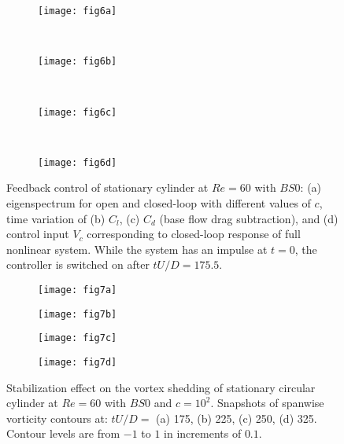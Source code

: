 \documentclass[standard]{jfm}
\begin{document}
\begin{figure}
\centering
\begin{minipage}{.4\textwidth}
  \begin{subfigure}[c]{0.45\textwidth}
\centering
  \texttt{[image: fig6a]} 
    \caption{}
    \label{fig:sta_eig}
    \end{subfigure}  \\
\end{minipage} 
\begin{minipage}{.4\textwidth}
\begin{subfigure}[b]{0.4\textwidth} 
\centering
  \texttt{[image: fig6b]}
	\caption{}
	\label{fig:lco_cl}
	\end{subfigure}	\\
\begin{subfigure}[b]{0.4\textwidth} 
\centering
  \texttt{[image: fig6c]} 
	\caption{}
	\label{fig:lco_cd}
	\end{subfigure}	\\
\begin{subfigure}[b]{0.4\textwidth} 
\centering
  \texttt{[image: fig6d]}
	\caption{}
	\label{fig:lco_uc}
	\end{subfigure}				
\end{minipage}%
\caption{Feedback control of stationary cylinder at $Re=60$ with $BS0$: 
      (a) eigenspectrum for open and closed-loop with different values of $c$, 
         time variation of (b) $C_l$, (c) $C_d$ (base flow drag subtraction),
         and (d) control input $V_c$ corresponding to closed-loop response of  
         full nonlinear system.  While the system has an impulse at $t=0$, 
         the controller is switched on after $tU/D=175.5$.
         }
\end{figure}
\begin{figure}
\centering
\begin{subfigure}[b]{0.495\textwidth} 
\centering
  \texttt{[image: fig7a]}
	\caption{}
	\label{fig:iso_vor1}
	\end{subfigure}	
\begin{subfigure}[b]{0.495\textwidth} 
\centering
  \texttt{[image: fig7b]}
	\caption{}
	\label{fig:iso_vor2}
	\end{subfigure}	
\begin{subfigure}[b]{0.495\textwidth} 
\centering
  \texttt{[image: fig7c]}
	\caption{}
	\label{fig:iso_vor3}
	\end{subfigure}	
\begin{subfigure}[b]{0.495\textwidth} 
\centering
  \texttt{[image: fig7d]}
	\caption{}
	\label{fig:iso_vor4}
	\end{subfigure}	
        \caption{Stabilization effect on the vortex shedding of stationary circular cylinder at $Re=60$ with $BS0$ and $c=10^2$. 
        Snapshots of spanwise vorticity contours at: 
        $tU/D=$ (a) 175, (b) 225, (c) 250, (d) 325. 
        Contour levels are from $-1$ to $1$ in increments of $0.1$.}
        \label{fig:iso_vor}
\end{figure}
\end{document}
